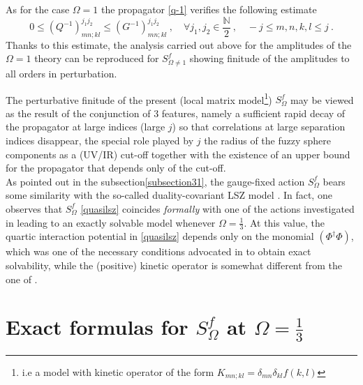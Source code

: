 \documentclass[a4paper,11pt,twoside]{article}
\numberwithin{equation}{section}
\theoremstyle{nonumberplain}
\begin{document}
%
As for the case $\Omega=1$ the propagator \eqref{q-1} verifies the following estimate%
%
\begin{equation}
0\le (Q^{-1})^{j_1j_2}_{mn;kl}\le(G^{-1})^{j_1j_2}_{mn;kl} \ , \quad \forall j_1,j_2\in\frac{\mathbb{N}}{2} \ , \quad -j\le m,n,k,l\le j \ . \label{envelop-number2}
\end{equation}
%
Thanks to this estimate, the analysis carried out above for the amplitudes of the $\Omega=1$ theory can be reproduced for $S^f_{\Omega\ne1}$ showing finitude of the amplitudes to all orders in perturbation.\par%
%
The perturbative finitude of the present (local matrix model{\footnote{i.e a model with kinetic operator of the form $K_{mn;kl}=\delta_{mn}\delta_{kl}f(k,l)$ }}) $S^f_{\Omega}$ may be viewed as the result of the conjunction of 3 features, namely a sufficient rapid decay of the propagator at large indices (large $j$) so that correlations at large separation indices disappear, the special role played by $j$ the radius of the fuzzy sphere components as a (UV/IR) cut-off together with the existence of an upper bound for the propagator that depends only of the cut-off.\\
As pointed out in the subsection\ref{subsection31}, the gauge-fixed action $S^f_{\Omega}$ bears some similarity with the so-called duality-covariant LSZ model \cite{LSZ}. In fact, one observes that $S^f_{\Omega}$ \eqref{quasilsz} coincides {\it{formally}} with one of the actions investigated in \cite{LSZ} leading to an exactly solvable model whenever $\Omega=\frac{1}{3}$. At this value, the quartic interaction potential in \eqref{quasilsz} depends only on the monomial $(\Phi^\dag\Phi)$, which was one of the necessary conditions advocated in \cite{LSZ} to obtain exact solvability, while the (positive) kinetic operator is somewhat different from the one of \cite{LSZ}.%


\section{\texorpdfstring{Exact formulas for $S^f_\Omega$ at $\Omega=\frac{1}{3}$}{Exact formulas}}\label{section4}
\end{document}
